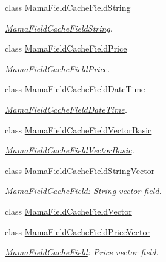\begin{DoxyCompactItemize}
class \hyperlink{classWombat_1_1MamaFieldCacheFieldString}{MamaFieldCacheFieldString}
\begin{DoxyCompactList}\small\item\em \hyperlink{classWombat_1_1MamaFieldCacheFieldString}{MamaFieldCacheFieldString}. \item\end{DoxyCompactList}\item 
class \hyperlink{classWombat_1_1MamaFieldCacheFieldPrice}{MamaFieldCacheFieldPrice}
\begin{DoxyCompactList}\small\item\em \hyperlink{classWombat_1_1MamaFieldCacheFieldPrice}{MamaFieldCacheFieldPrice}. \item\end{DoxyCompactList}\item 
class \hyperlink{classWombat_1_1MamaFieldCacheFieldDateTime}{MamaFieldCacheFieldDateTime}
\begin{DoxyCompactList}\small\item\em \hyperlink{classWombat_1_1MamaFieldCacheFieldDateTime}{MamaFieldCacheFieldDateTime}. \item\end{DoxyCompactList}\item 
class \hyperlink{classWombat_1_1MamaFieldCacheFieldVectorBasic}{MamaFieldCacheFieldVectorBasic}
\begin{DoxyCompactList}\small\item\em \hyperlink{classWombat_1_1MamaFieldCacheFieldVectorBasic}{MamaFieldCacheFieldVectorBasic}. \item\end{DoxyCompactList}\item 
class \hyperlink{classWombat_1_1MamaFieldCacheFieldStringVector}{MamaFieldCacheFieldStringVector}
\begin{DoxyCompactList}\small\item\em \hyperlink{classWombat_1_1MamaFieldCacheField}{MamaFieldCacheField}: String vector field. \item\end{DoxyCompactList}\item 
class \hyperlink{classWombat_1_1MamaFieldCacheFieldVector}{MamaFieldCacheFieldVector}
\item 
class \hyperlink{classWombat_1_1MamaFieldCacheFieldPriceVector}{MamaFieldCacheFieldPriceVector}
\begin{DoxyCompactList}\small\item\em \hyperlink{classWombat_1_1MamaFieldCacheField}{MamaFieldCacheField}: Price vector field. \item\end{DoxyCompactList}\item 

\end{DoxyCompactItemize}
